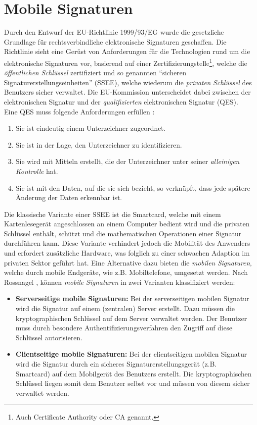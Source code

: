 \documentclass[11pt,a4paper,ngerman]{scrreprt}
\begin{document}
\section{Mobile Signaturen}\label{sec:MobileSignaturen}
Durch den Entwurf der EU-Richtlinie 1999/93/EG wurde die gesetzliche Grundlage für rechtsverbindliche elektronische Signaturen geschaffen. Die Richtlinie sieht eine Gerüst von Anforderungen für die Technologien rund um die elektronische Signaturen vor, basierend auf einer Zertifizierungstelle\footnote{Auch Certificate Authority oder CA genannt.}, welche die \emph{öffentlichen Schlüssel} zertifiziert und so genannten ``sicheren Signaturerstellungseinheiten'' (SSEE), welche wiederum die \emph{privaten Schlüssel} des Benutzers sicher verwaltet. Die EU-Kommission unterscheidet dabei zwischen der elektronischen Signatur und der \emph{qualifizierten} elektronischen Signatur (QES). Eine QES muss folgende Anforderungen erfüllen \cite{eSigEU99}:
\begin{enumerate}
    \item Sie ist eindeutig einem Unterzeichner zugeordnet.
    \item Sie ist in der Lage, den Unterzeichner zu identifizieren.
    \item Sie wird mit Mitteln erstellt, die der Unterzeichner unter seiner \emph{alleinigen Kontrolle} hat.
    \item Sie ist mit den Daten, auf die sie sich bezieht, so verknüpft, dass jede spätere Änderung der Daten erkennbar ist.
\end{enumerate}
Die klassische Variante einer SSEE ist die Smartcard, welche mit einem Kartenlesegerät angeschlossen an einem Computer bedient wird und die privaten Schlüssel enthält, schützt und die mathematischen Operationen einer Signatur durchführen kann. Diese Variante verhindert jedoch die Mobilität des Anwenders und erfordert zusätzliche Hardware, was folglich zu einer schwachen Adaption im privaten Sektor geführt hat. Eine Alternative dazu bieten die \textit{mobilen Signaturen}, welche durch mobile Endgeräte, wie z.B. Mobiltelefone, umgesetzt werden. Nach Rossnagel \cite{rossnagel}, können \textit{mobile Signaturen}   in zwei Varianten klassifiziert werden:
\begin{itemize}
    \item \textbf{Serverseitige mobile Signaturen:} Bei der serverseitigen mobilen Signatur wird die Signatur auf einem (zentralen) Server erstellt. Dazu müssen die kryptographischen Schlüssel auf dem Server verwaltet werden. Der Benutzer muss durch besondere Authentifizierungsverfahren den Zugriff auf diese Schlüssel autorisieren.
    \item \textbf{Clientseitige mobile Signaturen:} Bei der clientseitigen mobilen Signatur wird die Signatur durch ein sicheres Signaturerstellungsgerät (z.B. Smartcard) auf dem Mobilgerät des Benutzers erstellt. Die kryptographischen Schlüssel liegen somit dem Benutzer selbst vor und müssen von diesem sicher verwaltet werden.
\end{itemize}
\end{document}
